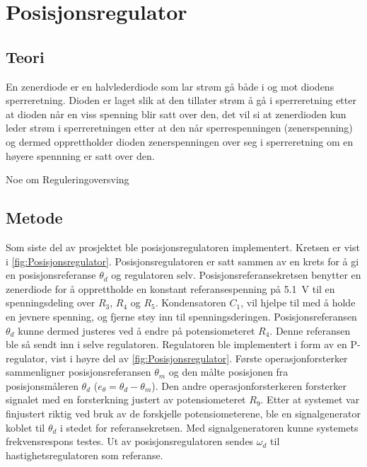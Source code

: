 \section{Posisjonsregulator}\label{sec:posisjonsregulator}

\subsection{Teori}




En zenerdiode er en halvlederdiode som lar strøm gå både i og mot diodens sperreretning. Dioden er laget slik at den tillater strøm å gå i sperreretning etter at dioden når en viss spenning blir satt over den, det vil si at zenerdioden kun leder strøm i sperreretningen etter at den når sperrespenningen (zenerspenning) og dermed opprettholder dioden zenerspenningen over seg i sperreretning om en høyere spennning er satt over den.


Noe om Reguleringoversving







\subsection{Metode}

Som siste del av prosjektet ble posisjonsregulatoren implementert. Kretsen er vist i \autoref{fig:Posisjonsregulator}. Posisjonsregulatoren er satt sammen av en krets for å gi en posisjonsreferanse $\theta_d$ og regulatoren selv.
Posisjonsreferansekretsen benytter en zenerdiode for å opprettholde en konstant referansespenning på {\SI{5.1}{\volt}} til en spenningsdeling over $R_3$, $R_4$ og $R_5$. Kondensatoren $C_1$, vil hjelpe til med å holde en jevnere spenning, og fjerne støy inn til spenningsderingen. Posisjonsreferansen $\theta_d$ kunne dermed justeres ved å endre på potensiometeret $R_4$. Denne referansen ble så sendt inn i selve regulatoren. Regulatoren ble implementert i form av en P-regulator, vist i høyre del av \autoref{fig:Posisjonsregulator}. Første operasjonforsterker sammenligner posisjonsreferansen $\theta_m$ og den målte posisjonen fra posisjonsmåleren $\theta_d$ ($e_{\theta} = \theta_d - \theta_m$). Den andre operasjonforsterkeren forsterker signalet med en forsterkning justert av potensiometeret $R_9$. Etter at systemet var finjustert riktig ved bruk av de forskjelle potensiometerene, ble en signalgenerator koblet til $\theta_d$ i stedet for referansekretsen. Med signalgeneratoren kunne systemets frekvensrespons testes.
Ut av posisjonsregulatoren sendes $\omega_d$ til hastighetsregulatoren som referanse.







